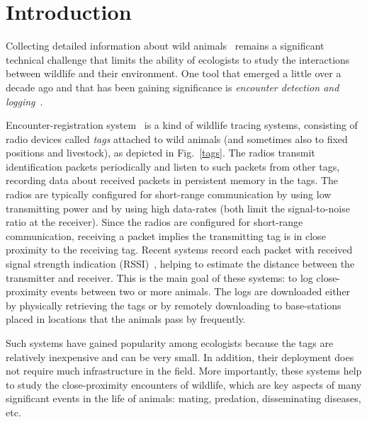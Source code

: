 \section{Introduction}

Collecting detailed information about wild 
animals~\cite{Prangle2006NewRadiocolars,Rutz2012AutomatedMapping} 
remains a significant technical challenge that
limits the ability of ecologists to study the interactions between wildlife and their environment. 
One tool that emerged a little over a decade ago
and that has been gaining significance is 
{\em encounter detection and logging}~\cite{Tentelier2016FishNetwork,
Bohm2009WildlifeLivestock,Ripperger2016ProximitySensing}.

Encounter-registration system~\cite{Levin2015Performance,Menhill2012NovelTelemetry,dressler2016bats} 
is a kind of wildlife tracing systems,
consisting of radio devices called {\em tags} attached to wild
animals (and sometimes also to fixed positions and livestock), as depicted in Fig.~\ref{tags}. 
The radios transmit identification
packets periodically and listen to such packets from other tags,
recording data about received packets in persistent memory in the tags. The
radios are typically configured for short-range communication by using low transmitting power and by 
using high data-rates (both limit the signal-to-noise ratio at the receiver). Since the radios
are configured for short-range communication, receiving a packet implies the transmitting tag is
in close proximity to the receiving tag. Recent systems record each packet with received signal strength
indication (RSSI)~\cite{Daiya2011Experimental}, helping to estimate the distance between the transmitter and receiver.
This is the main goal of these systems: to log close-proximity
events between two or more animals. The logs are downloaded either by physically retrieving the tags 
or by remotely downloading to base-stations placed in locations that the animals pass by frequently.

Such systems have gained popularity among ecologists because 
the tags are relatively inexpensive and can
be very small. In addition, their deployment does not require much infrastructure in the field.
More importantly, these systems help to study the close-proximity encounters of wildlife, 
which are key aspects of many significant 
events in the life of animals: mating, predation, disseminating diseases, etc.


